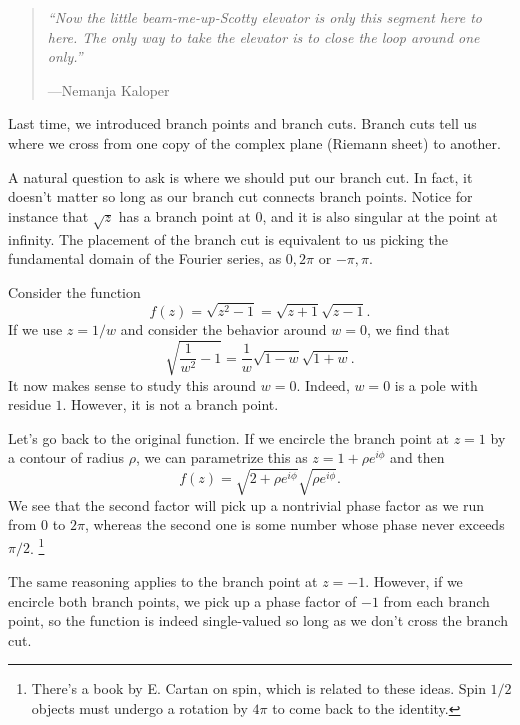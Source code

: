 \begin{quote}
    \textit{``Now the little beam-me-up-Scotty elevator is only this segment here to here. The only way to take the elevator is to close the loop around one only.''}
    
    ---Nemanja Kaloper
\end{quote}

Last time, we introduced branch points and branch cuts. Branch cuts tell us where we cross from one copy of the complex plane (Riemann sheet) to another.

A natural question to ask is where we should put our branch cut. In fact, it doesn't matter so long as our branch cut connects branch points. Notice for instance that $\sqrt{z}$ has a branch point at $0$, and it is also singular at the point at infinity. The placement of the branch cut is equivalent to us picking the fundamental domain of the Fourier series, as $0,2\pi$ or $-\pi,\pi$.

\begin{exm}
    Consider the function
    \begin{equation}
        f(z) = \sqrt{z^2-1} = \sqrt{z+1}\sqrt{z-1}.
    \end{equation}
    If we use $z=1/w$ and consider the behavior around $w=0$, we find that
    \begin{equation}
        \sqrt{\frac{1}{w^2}-1} = \frac{1}{w} \sqrt{1-w}\sqrt{1+w}.
    \end{equation}
    It now makes sense to study this around $w=0$. Indeed, $w=0$ is a pole with residue $1$. However, it is not a branch point.
    
    Let's go back to the original function. If we encircle the branch point at $z=1$ by a contour of radius $\rho$, we can parametrize this as $z=1+\rho e^{i\phi}$ and then
    \begin{equation}
        f(z) = \sqrt{2+\rho e^{i\phi}}\sqrt{\rho e^{i\phi}}.
    \end{equation}
    We see that the second factor will pick up a nontrivial phase factor as we run from $0$ to $2\pi$, whereas the second one is some number whose phase never exceeds $\pi/2$.%
        \footnote{There's a book by E. Cartan on spin, which is related to these ideas. Spin $1/2$ objects must undergo a rotation by $4\pi$ to come back to the identity.}
    
    The same reasoning applies to the branch point at $z=-1$. However, if we encircle both branch points, we pick up a phase factor of $-1$ from each branch point, so the function is indeed single-valued so long as we don't cross the branch cut.
\end{exm}

